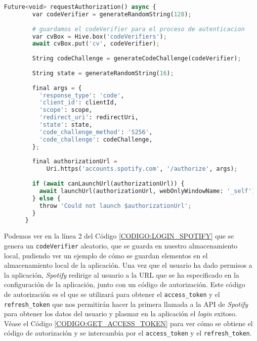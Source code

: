 \begin{lstlisting}[language=python, caption=Lanzar autenticación en \textit{Spotify}, label=CODIGO:LOGIN_SPOTIFY]
    Future<void> requestAuthorization() async {
        var codeVerifier = generateRandomString(128);
      
        # guardamos el codeVerifier para el proceso de autenticacion
        var cvBox = Hive.box('codeVerifiers');
        await cvBox.put('cv', codeVerifier);
      
        String codeChallenge = generateCodeChallenge(codeVerifier);
      
        String state = generateRandomString(16);
      
        final args = {
          'response_type': 'code',
          'client_id': clientId,
          'scope': scope,
          'redirect_uri': redirectUri,
          'state': state,
          'code_challenge_method': 'S256',
          'code_challenge': codeChallenge,
        };
      
        final authorizationUrl =
            Uri.https('accounts.spotify.com', '/authorize', args);
      
        if (await canLaunchUrl(authorizationUrl)) {
          await launchUrl(authorizationUrl, webOnlyWindowName: '_self');
        } else {
          throw 'Could not launch $authorizationUrl';
        }
      }
\end{lstlisting}
Podemos ver en la línea 2 del Código \ref{CODIGO:LOGIN_SPOTIFY} que se genera un \texttt{codeVerifier} aleatorio, que se guarda en nuestro almacenamiento local, pudiendo
ver un ejemplo de cómo se guardan elementos en el almacenamiento local de la aplicación.
Una vez que el usuario ha dado permisos a la aplicación, \textit{Spotify} redirige al usuario a la URL que se ha especificado en la configuración de la aplicación, 
junto con un código de autorización. Este código de autorización es el que se utilizará para obtener el \texttt{access\_token} y el \texttt{refresh\_token} que nos permitirán
hacer la primera llamada a la API de \textit{Spotify} para obtener los datos del usuario y plasmar en la aplicación el \textit{login} exitoso. 
Véase el Código \ref{CODIGO:GET_ACCESS_TOKEN} para ver cómo se obtiene el código de autorización y se intercambia por el \texttt{access\_token} y el \texttt{refresh\_token}. 


